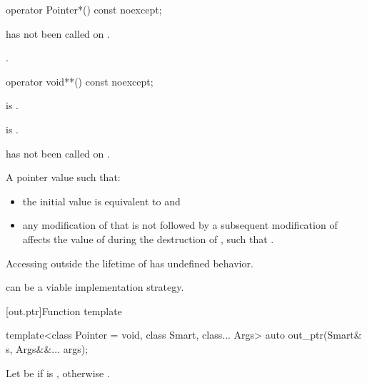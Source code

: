 \begin{itemdecl}
operator Pointer*() const noexcept;
\end{itemdecl}

\begin{itemdescr}
\pnum
\expects
{} has not been called on .

\pnum
\returns
{}.
\end{itemdescr}

\begin{itemdecl}
operator void**() const noexcept;
\end{itemdecl}

\begin{itemdescr}
\pnum
\constraints
{} is .

\pnum
\mandates
{} is .

\pnum
\expects
{} has not been called on .

\pnum
\returns
A pointer value  such that:
\begin{itemize}
\item
the initial value  is equivalent to  and
\item
any modification of 
that is not followed by a subsequent modification of 
affects the value of  during the destruction of ,
such that .
\end{itemize}

\pnum
\remarks
Accessing  outside the lifetime of 
has undefined behavior.

\pnum
\begin{note}
can be a viable implementation strategy.
\end{note}
\end{itemdescr}

[out.ptr]{Function template }

%
\begin{itemdecl}
template<class Pointer = void, class Smart, class... Args>
  auto out_ptr(Smart& s, Args&&... args);
\end{itemdecl}

\begin{itemdescr}
\pnum
Let  be 
if  is ,
otherwise .

\pnum
\returns
{}
\end{itemdescr}

